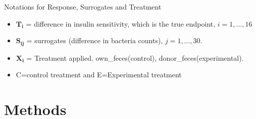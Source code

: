 \documentclass[a4paper,9pt]{beamer}\usepackage[]{graphicx}\usepackage[]{color}
\begin{document}
\begin{frame}{Notations for Response, Surrogates and Treatment}
\begin{itemize}
\item $\mathbf{T_i}$ = difference in insulin sensitivity, which is the true endpoint, $i=1,\ldots,16$
\item $\mathbf{S_{ij}}$ = surrogates (difference in bacteria counts),  $j=1,\ldots,30$. 
\item $\mathbf{X_i}$ = Treatment applied. own\_feces(control), donor\_feces(experimental).
\item C=control treatment and E=Experimental treatment
\end{itemize}

\end{frame}

\section{Methods}
\end{document}
